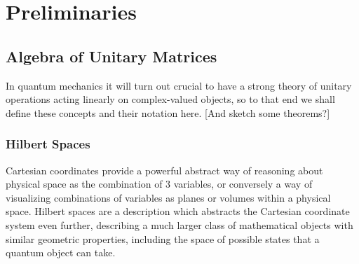 




\chapter[PRELIMINARIES]{Preliminaries}
\section{Algebra of Unitary Matrices}
In quantum mechanics it will turn out crucial to have a strong theory of unitary operations acting linearly on complex-valued objects, so to that end we shall define these concepts and their notation here. [And sketch some theorems?]
\subsection{Hilbert Spaces}
Cartesian coordinates provide a powerful abstract way of reasoning about physical space as the combination of 3 variables, or conversely a way of visualizing combinations of variables as planes or volumes within a physical space. Hilbert spaces are a description which abstracts the Cartesian coordinate system even further, describing a much larger class of mathematical objects with similar geometric properties, including the space of possible states that a quantum object can take.

